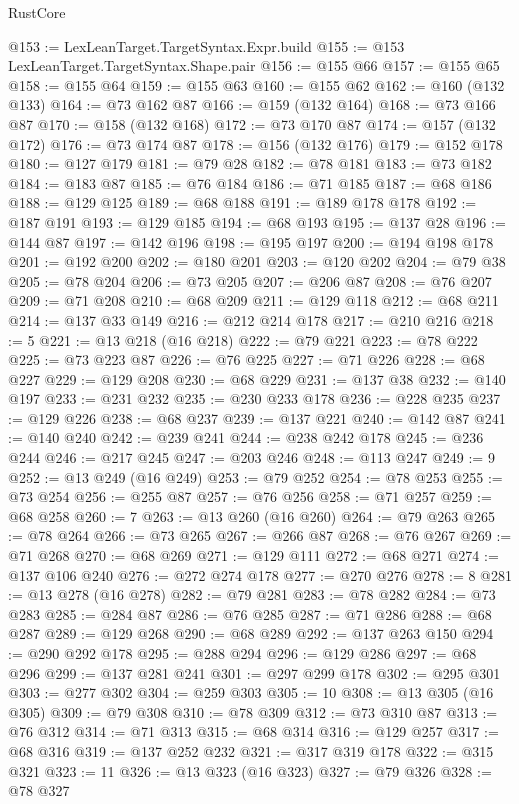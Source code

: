 \begin{lexlean}{RustCore}
\begin{coremodule}
@153 := LexLeanTarget.TargetSyntax.Expr.build
@155 := @153 LexLeanTarget.TargetSyntax.Shape.pair
@156 := @155 @66
@157 := @155 @65
@158 := @155 @64
@159 := @155 @63
@160 := @155 @62
@162 := @160 (@132 @133)
@164 := @73 @162 @87
@166 := @159 (@132 @164)
@168 := @73 @166 @87
@170 := @158 (@132 @168)
@172 := @73 @170 @87
@174 := @157 (@132 @172)
@176 := @73 @174 @87
@178 := @156 (@132 @176)
@179 := @152 @178
@180 := @127 @179
@181 := @79 @28
@182 := @78 @181
@183 := @73 @182
@184 := @183 @87
@185 := @76 @184
@186 := @71 @185
@187 := @68 @186
@188 := @129 @125
@189 := @68 @188
@191 := @189 @178 @178
@192 := @187 @191
@193 := @129 @185
@194 := @68 @193
@195 := @137 @28
@196 := @144 @87
@197 := @142 @196
@198 := @195 @197
@200 := @194 @198 @178
@201 := @192 @200
@202 := @180 @201
@203 := @120 @202
@204 := @79 @38
@205 := @78 @204
@206 := @73 @205
@207 := @206 @87
@208 := @76 @207
@209 := @71 @208
@210 := @68 @209
@211 := @129 @118
@212 := @68 @211
@214 := @137 @33 @149
@216 := @212 @214 @178
@217 := @210 @216
@218 := 5
@221 := @13 @218 (@16 @218)
@222 := @79 @221
@223 := @78 @222
@225 := @73 @223 @87
@226 := @76 @225
@227 := @71 @226
@228 := @68 @227
@229 := @129 @208
@230 := @68 @229
@231 := @137 @38
@232 := @140 @197
@233 := @231 @232
@235 := @230 @233 @178
@236 := @228 @235
@237 := @129 @226
@238 := @68 @237
@239 := @137 @221
@240 := @142 @87
@241 := @140 @240
@242 := @239 @241
@244 := @238 @242 @178
@245 := @236 @244
@246 := @217 @245
@247 := @203 @246
@248 := @113 @247
@249 := 9
@252 := @13 @249 (@16 @249)
@253 := @79 @252
@254 := @78 @253
@255 := @73 @254
@256 := @255 @87
@257 := @76 @256
@258 := @71 @257
@259 := @68 @258
@260 := 7
@263 := @13 @260 (@16 @260)
@264 := @79 @263
@265 := @78 @264
@266 := @73 @265
@267 := @266 @87
@268 := @76 @267
@269 := @71 @268
@270 := @68 @269
@271 := @129 @111
@272 := @68 @271
@274 := @137 @106 @240
@276 := @272 @274 @178
@277 := @270 @276
@278 := 8
@281 := @13 @278 (@16 @278)
@282 := @79 @281
@283 := @78 @282
@284 := @73 @283
@285 := @284 @87
@286 := @76 @285
@287 := @71 @286
@288 := @68 @287
@289 := @129 @268
@290 := @68 @289
@292 := @137 @263 @150
@294 := @290 @292 @178
@295 := @288 @294
@296 := @129 @286
@297 := @68 @296
@299 := @137 @281 @241
@301 := @297 @299 @178
@302 := @295 @301
@303 := @277 @302
@304 := @259 @303
@305 := 10
@308 := @13 @305 (@16 @305)
@309 := @79 @308
@310 := @78 @309
@312 := @73 @310 @87
@313 := @76 @312
@314 := @71 @313
@315 := @68 @314
@316 := @129 @257
@317 := @68 @316
@319 := @137 @252 @232
@321 := @317 @319 @178
@322 := @315 @321
@323 := 11
@326 := @13 @323 (@16 @323)
@327 := @79 @326
@328 := @78 @327

\end{coremodule}
\end{lexlean}
